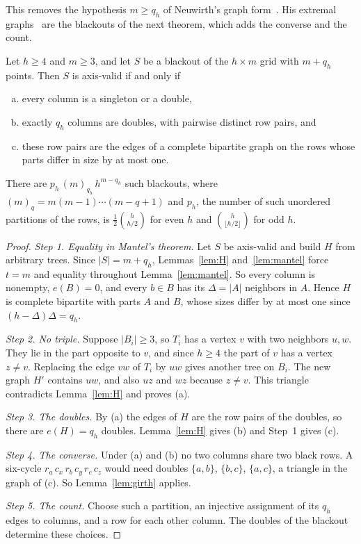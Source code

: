 This removes the hypothesis $m\ge q_h$ of Neuwirth's graph form~\cite[Theorem~1(ii)]{neuwirth2001}. His extremal graphs~\cite[Proposition~17]{neuwirth2001} are the blackouts of the next theorem, which adds the converse and the count.


\begin{theorem}\label{thm:equality}
Let $h\ge4$ and $m\ge3$, and let $S$ be a blackout of the $h\times m$ grid with $m+q_h$ points. Then $S$ is axis-valid if and only if
\begin{enumerate}[(a)]
\item every column is a singleton or a double,
\item exactly $q_h$ columns are doubles, with pairwise distinct row pairs, and
\item these row pairs are the edges of a complete bipartite graph on the rows whose parts differ in size by at most one.
\end{enumerate}
There are $p_h\,(m)_{q_h}\,h^{m-q_h}$ such blackouts, where $(m)_q=m(m-1)\cdots(m-q+1)$ and $p_h$, the number of such unordered partitions of the rows, is $\frac12\binom h{h/2}$ for even $h$ and $\binom h{\lfloor h/2\rfloor}$ for odd $h$.
\end{theorem}

\begin{proof}
\emph{Step 1. Equality in Mantel's theorem.} Let $S$ be axis-valid and build $H$ from arbitrary trees. Since $|S|=m+q_h$, Lemmas~\ref{lem:H} and~\ref{lem:mantel} force $t=m$ and equality throughout Lemma~\ref{lem:mantel}. So every column is nonempty, $e(B)=0$, and every $b\in B$ has its $\Delta=|A|$ neighbors in $A$. Hence $H$ is complete bipartite with parts $A$ and $B$, whose sizes differ by at most one since $(h-\Delta)\Delta=q_h$.

\emph{Step 2. No triple.} Suppose $|B_i|\ge3$, so $T_i$ has a vertex $v$ with two neighbors $u,w$. They lie in the part opposite to $v$, and since $h\ge4$ the part of $v$ has a vertex $z\ne v$. Replacing the edge $vw$ of $T_i$ by $uw$ gives another tree on $B_i$. The new graph $H'$ contains $uw$, and also $uz$ and $wz$ because $z\ne v$. This triangle contradicts Lemma~\ref{lem:H} and proves (a).

\emph{Step 3. The doubles.} By (a) the edges of $H$ are the row pairs of the doubles, so there are $e(H)=q_h$ doubles. Lemma~\ref{lem:H} gives (b) and Step~1 gives (c).

\emph{Step 4. The converse.} Under (a) and (b) no two columns share two black rows. A six-cycle $r_a\,c_x\,r_b\,c_y\,r_c\,c_z$ would need doubles $\{a,b\}$, $\{b,c\}$, $\{a,c\}$, a triangle in the graph of (c). So Lemma~\ref{lem:girth} applies.

\emph{Step 5. The count.} Choose such a partition, an injective assignment of its $q_h$ edges to columns, and a row for each other column. The doubles of the blackout determine these choices.
\end{proof}

